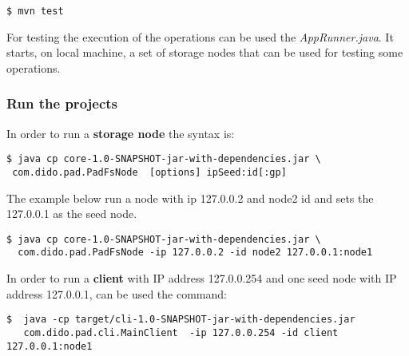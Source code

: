 \begin{verbatim}
$ mvn test
\end{verbatim}

For testing the execution of the operations can be used the  \textit{AppRunner.java}. It starts, on local machine, a set of storage nodes that can be used for testing some operations.

\subsubsection{Run the projects}
In order to run a \textbf{storage node} the syntax is:

\begin{verbatim}
$ java cp core-1.0-SNAPSHOT-jar-with-dependencies.jar \
 com.dido.pad.PadFsNode  [options] ipSeed:id[:gp]
\end{verbatim}
The example below run a node with ip 127.0.0.2 and node2 id and sets the
127.0.0.1 as the seed node.
\begin{verbatim}
$ java cp core-1.0-SNAPSHOT-jar-with-dependencies.jar \
  com.dido.pad.PadFsNode -ip 127.0.0.2 -id node2 127.0.0.1:node1
\end{verbatim}

In order to run a \textbf{client} with IP address 127.0.0.254  and one seed node with 
IP address 127.0.0.1, can be used the command:
\begin{verbatim}
$  java -cp target/cli-1.0-SNAPSHOT-jar-with-dependencies.jar 
   com.dido.pad.cli.MainClient  -ip 127.0.0.254 -id client 127.0.0.1:node1
\end{verbatim}


